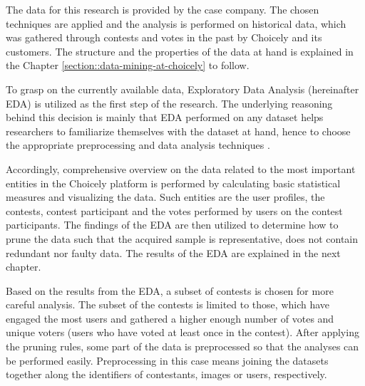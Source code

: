 The data for this research is provided by the case company. The chosen techniques are applied and the analysis is performed on historical data, which was gathered through contests and votes in the past by Choicely and its customers. The structure and the properties of the data at hand is explained in the Chapter \ref{section::data-mining-at-choicely} to follow.


To grasp on the currently available data, Exploratory Data Analysis (hereinafter EDA) is utilized as the first step of the research. The underlying reasoning behind this decision is mainly that EDA performed on any dataset helps researchers to familiarize themselves with the dataset at hand, hence to choose the appropriate preprocessing and data analysis techniques \cite{introtodatamining}. 

Accordingly, comprehensive overview on the data related to the most important entities in the Choicely platform is performed by calculating basic statistical measures and visualizing the data. Such entities are the user profiles, the contests, contest participant and the votes performed by users on the contest participants. The findings of the EDA are then utilized to determine how to prune the data such that the acquired sample is representative, does not contain redundant nor faulty data. The results of the EDA are explained in the next chapter. 

Based on the results from the EDA, a subset of contests is chosen for more careful analysis. The subset of the contests is limited to those, which have engaged the most users and gathered a higher enough number of votes and unique voters (users who have voted at least once in the contest). After applying the pruning rules, some part of the data is preprocessed so that the analyses can be performed easily. Preprocessing in this case means joining the datasets together along the identifiers of contestants, images or users, respectively.  

